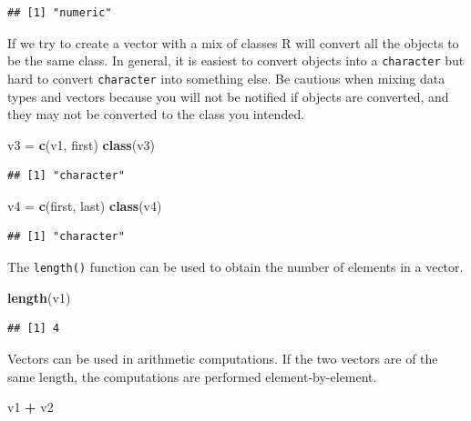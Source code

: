\documentclass[
]{book}
\newenvironment{Shaded}{\begin{snugshade}}{\end{snugshade}}
\newcommand{\KeywordTok}[1]{\textcolor[rgb]{0.13,0.29,0.53}{\textbf{#1}}}
\newcommand{\NormalTok}[1]{#1}
\newcommand{\OperatorTok}[1]{\textcolor[rgb]{0.81,0.36,0.00}{\textbf{#1}}}
\newcommand{\StringTok}[1]{\textcolor[rgb]{0.31,0.60,0.02}{#1}}
\begin{document}
\begin{verbatim}
## [1] "numeric"
\end{verbatim}

If we try to create a vector with a mix of classes R will convert all the objects to be the same class. In general, it is easiest to convert objects into a \texttt{character} but hard to convert \texttt{character} into something else. Be cautious when mixing data types and vectors because you will not be notified if objects are converted, and they may not be converted to the class you intended.

\begin{Shaded}
\begin{Highlighting}[]
\NormalTok{v3 =}\StringTok{ }\KeywordTok{c}\NormalTok{(v1, first)}
\KeywordTok{class}\NormalTok{(v3)}
\end{Highlighting}
\end{Shaded}

\begin{verbatim}
## [1] "character"
\end{verbatim}

\begin{Shaded}
\begin{Highlighting}[]
\NormalTok{v4 =}\StringTok{ }\KeywordTok{c}\NormalTok{(first, last)}
\KeywordTok{class}\NormalTok{(v4)}
\end{Highlighting}
\end{Shaded}

\begin{verbatim}
## [1] "character"
\end{verbatim}

The \texttt{length()} function can be used to obtain the number of elements in a vector.

\begin{Shaded}
\begin{Highlighting}[]
\KeywordTok{length}\NormalTok{(v1)}
\end{Highlighting}
\end{Shaded}

\begin{verbatim}
## [1] 4
\end{verbatim}

Vectors can be used in arithmetic computations. If the two vectors are of the same length, the computations are performed element-by-element.

\begin{Shaded}
\begin{Highlighting}[]
\NormalTok{v1 }\OperatorTok{+}\StringTok{ }\NormalTok{v2}
\end{Highlighting}
\end{Shaded}
\end{document}
